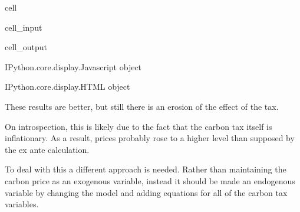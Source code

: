 \documentclass[letterpaper,10pt,english]{jupyterBook}
\begin{document}
\begin{sphinxuseclass}{cell}\begin{sphinxVerbatimInput}

\begin{sphinxuseclass}{cell_input}
\begin{sphinxVerbatim}[commandchars=\\\{\}]
\end{sphinxVerbatim}

\end{sphinxuseclass}\end{sphinxVerbatimInput}
\begin{sphinxVerbatimOutput}

\begin{sphinxuseclass}{cell_output}
\begin{sphinxVerbatim}[commandchars=\\\{\}]
\PYGZlt{}IPython.core.display.Javascript object\PYGZgt{}
\end{sphinxVerbatim}

\begin{sphinxVerbatim}[commandchars=\\\{\}]
\PYGZlt{}IPython.core.display.HTML object\PYGZgt{}
\end{sphinxVerbatim}

\end{sphinxuseclass}\end{sphinxVerbatimOutput}

\end{sphinxuseclass}
\sphinxAtStartPar
These results are better, but still there is an erosion of the effect of the tax.

\sphinxAtStartPar
On introspection, this is likely due to the fact that the carbon tax itself is inflationary.  As a result, prices probably rose to a higher level than supposed by the ex ante calculation.

\sphinxAtStartPar
To deal with this a different approach is needed.  Rather than maintaining the carbon price as an exogenous variable, instead it should be made an endogenous variable by changing the model and adding equations for all of the carbon tax variables.
\end{document}
